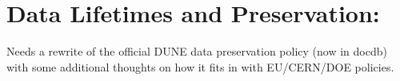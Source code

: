 \chapter{Data Lifetimes and Preservation: }
\label{ch:pres}


Needs a rewrite of the official DUNE data preservation policy (now in docdb) with some additional thoughts on how it fits in with EU/CERN/DOE policies. 